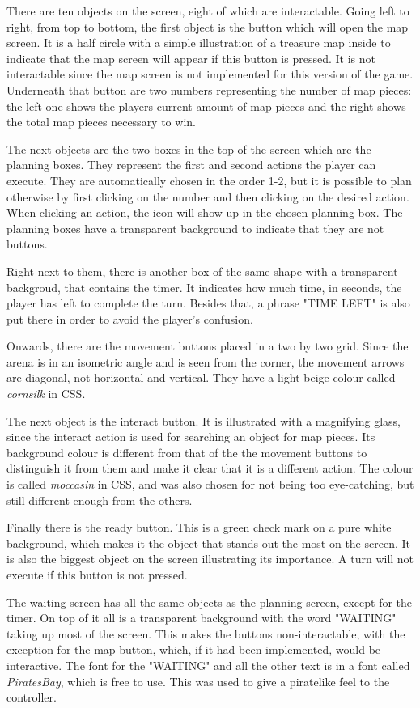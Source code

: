 There are ten objects on the screen, eight of which are interactable.
Going left to right, from top to bottom, the first object is the button which will open the map screen. It is a half circle with a simple illustration of a treasure map inside to indicate that the map screen will appear if this button is pressed. It is not interactable since the map screen is not implemented for this version of the game. Underneath that button are two numbers representing the number of map pieces: the left one shows the players current amount of map pieces and the right shows the total map pieces necessary to win.

The next objects are the two boxes in the top of the screen which are the planning boxes. They represent the first and second actions the player can execute. They are automatically chosen in the order 1-2, but it is possible to plan otherwise by first clicking on the number and then clicking on the desired action. When clicking an action, the icon will show up in the chosen planning box. The planning boxes have a transparent background to indicate that they are not buttons. 

Right next to them, there is another box of the same shape with a transparent backgroud, that contains the timer. It indicates how much time, in seconds, the player has left to complete the turn. Besides that, a phrase "TIME LEFT" is also put there in order to avoid the player's confusion.

Onwards, there are the movement buttons placed in a two by two grid. Since the arena is in an isometric angle and is seen from the corner, the movement arrows are diagonal, not horizontal and vertical. They have a light beige colour called \textit{cornsilk} in CSS. 

The next object is the interact button. It is illustrated with a magnifying glass, since the interact action is used for searching an object for map pieces. Its background colour is different from that of the the movement buttons to distinguish it from them and make it clear that it is a different action. The colour is called \textit{moccasin} in CSS, and was also chosen for not being too eye-catching, but still different enough from the others. 

Finally there is the ready button. This is a green check mark on a pure white background, which makes it the object that stands out the most on the screen. It is also the biggest object on the screen illustrating its importance. A turn will not execute if this button is not pressed. 

The waiting screen has all the same objects as the planning screen, except for the timer. On top of it all is a transparent background with the word "WAITING" taking up most of the screen. This makes the buttons non-interactable, with the exception for the map button, which, if it had been implemented, would be interactive. The font for the "WAITING" and all the other text is in a font called \textit{PiratesBay}, which is free to use. This was used to give a piratelike feel to the controller.